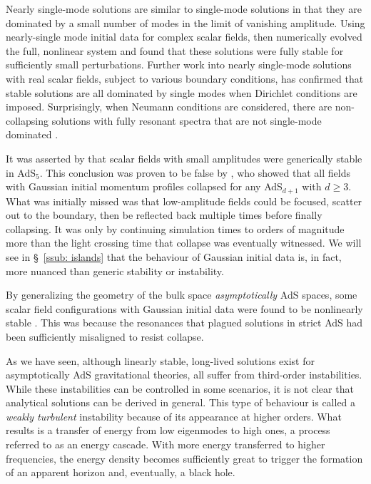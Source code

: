 \documentclass[../PhD.tex]{subfiles}
\begin{document}
Nearly single-mode solutions are similar to single-mode solutions in that they are dominated by a small number of modes in the limit of vanishing amplitude. Using nearly-single mode initial data for complex scalar fields, \cite{1304.4166} then numerically evolved the full, nonlinear system and found that these solutions were fully stable for sufficiently small perturbations. Further work into nearly single-mode solutions with real scalar fields, subject to various boundary conditions, has confirmed that stable solutions are all dominated by single modes when Dirichlet conditions are imposed. Surprisingly, when Neumann conditions are considered, there are non-collapsing solutions with fully resonant spectra that are not single-mode dominated \cite{1908.02296}.


It was asserted by \cite{1106.2339} that scalar fields with small amplitudes were generically stable in AdS$_5$. This conclusion was proven to be false by \cite{1108.4539}, who showed that all fields with Gaussian initial momentum profiles collapsed for any AdS$_{d+1}$ with $d \geq 3$. What was initially missed was that low-amplitude fields could be focused, scatter out to the boundary, then be reflected back multiple times before finally collapsing. It was only by continuing simulation times to orders of magnitude more than the light crossing time that collapse was eventually witnessed. We will see in \S~\!\ref{ssub: islands} that the behaviour of Gaussian initial data is, in fact, more nuanced than generic stability or instability.

By generalizing the geometry of the bulk space \emph{asymptotically} AdS spaces, some scalar field configurations with Gaussian initial data were found to be nonlinearly stable \cite{1208.5772}. This was because the resonances that plagued solutions in strict AdS had been sufficiently misaligned to resist collapse. 


As we have seen, although linearly stable, long-lived solutions exist for asymptotically AdS gravitational theories, all suffer from third-order instabilities. While these instabilities can be controlled in some scenarios, it is not clear that analytical solutions can be derived in general. This type of behaviour is called a \emph{weakly turbulent} instability because of its appearance at higher orders. What results is a transfer of energy from low eigenmodes to high ones, a process referred to as an energy cascade. With more energy transferred to higher frequencies, the energy density becomes sufficiently great to trigger the formation of an apparent horizon and, eventually, a black hole.
\end{document}
